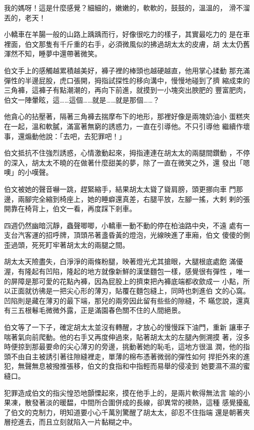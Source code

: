 我的媽呀！這是什麼感覺？細細的，嫩嫩的，軟軟的，鼓鼓的，溫溫的，
滑不溜丟的，老天！

小轎車在羊腸一般的山路上踽踽而行，好像很吃力的樣子，其實最吃力的
是在車裡面，伯文那隻有千斤重的右手，必須微風似的拂過胡太太的皮膚，胡
太太仍舊渾然不知，睡夢中還帶著微笑。

伯文手上的感觸越累積越美好，褲子裡的棒頭也越硬越直，他用掌心揉動
那充滿彈性的半邊屁股，虎口張開，拇指試探性的移向溝中，慢慢地碰到了擠
縮成束的三角褲，這褲子有點潮潮的，再向下前進，就摸到一小塊突出腴肥的
豐富肥肉，伯文一陣暈眩，這……這個……就是……就是那個……？

他貪心的拈壓著，隔著三角褲去揣摩布下的地形，那裡好像是兩塊奶油小
蛋糕夾在一起，溫和軟膩，滿富著無窮的誘惑力，一直在引導他。不只引導他
繼續作壞事，還煽動他說：「去吧，去犯罪吧！」

伯文抵抗不住強烈誘惑，心情激動起來，拇指連連在胡太太的兩腿間鑽動
，不停的深入，胡太太不曉的在做著什麼甜美的夢，除了一直在微笑之外，還
發出「嗯噢」的小嘆聲。

伯文被她的聲音嚇一跳，趕緊縮手，結果胡太太聳了聳肩膀，頭更挪向車
門那邊，兩腳完全縮到椅座上，她的睡癖還真差，右腿平放，左腳一搖，大剌
剌的張開靠在椅背上，伯文一看，再度踩下剎車。

四週仍然幽暗沉靜，蟲聲唧唧，小轎車一動不動的停在柏油路中央，不遠
處有一支台汽客運的招呼牌，頂頭吊著盞昏黃的燈泡，光線映進了車廂，伯文
傻傻的側歪過頭，死死盯牢著胡太太的兩腿之間。

胡太太天險盡失，白淨淨的兩條粉腿，映著燈光尤其搶眼，大腿根底處飽
滿優渥，有隆起有凹陷，隆起的地方就像新鮮的漢堡麵包一樣，感覺很有彈性
，唯一的屏障是那可愛的花點內褲，因為屁股上的擠束把內褲底端都收歛成一
小點，所以正面就彷彿是一把尖心形的薄刃，貼覆在麵包縫上，同時也刺進伯
文的心窩。凹陷則是藏在薄刃的最下端，那兒的兩旁因此留有些些的隙縫，不
瞞您說，還真有三五根鬈毛微微外露，正是滿園春色關不住的人間絕景。

伯文等了一下子，確定胡太太並沒有轉醒，才放心的慢慢踩下油門，重新
讓車子喘著氣向前爬動。他的右手又再度伸過來，貼著胡太太的左腿內側溯摸
著，沒多時便掠到那最要命的尖心薄刃的旁邊，挑動著她的恥毛，這地方很溫
潤，他的指頭不由自主被誘引著往隙縫裡走，單薄的棉布憑著微弱的彈性如何
捍拒外來的進犯，無聲無息被撥推張移，伯文的食指和中指輕而易舉的侵凌到
她要濕不濕的蜜縫口。

犯罪造成伯文的指尖惶恐地顫慄起來，摸在他手上的，是兩片軟得無法言
喻的小果凍，散發著淡的暖馧，中間所合圍併成的長線，卻異常的襖熱，這種
感覺擾亂了伯文的克制力，明知道要小心千萬別驚醒了胡太太，卻忍不住指端
還是朝著夾層挖進去，而且立刻就陷入一片黏糊之中。

